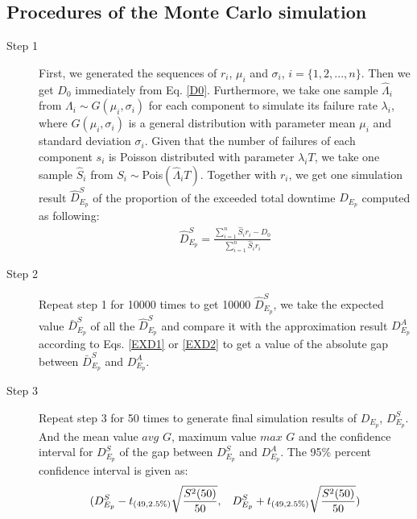 \documentclass[preprint,12pt]{elsarticle}
\begin{document}
\begin{appendices}

\section{Procedures of the Monte Carlo simulation}
\label{MCP}
\begin{description}
\item[Step 1]
First, we generated the sequences of $r_{i}$, $\mu_{i}$ and $\sigma_{i}$, $i=\{1,2,...,n\}$. Then we get $D_0$ immediately from Eq. \eqref{D0}. Furthermore, we take one sample $\hat{\Lambda}_{i}$ from $\Lambda_{i} \sim G(\mu_{i},\sigma_{i})$ for each component to simulate its failure rate $\lambda_{i}$, where $G(\mu_{i},\sigma_{i})$ is a general distribution with parameter mean $\mu_{i}$ and standard deviation $\sigma_{i}$. Given that the number of failures of each component $s_{i}$ is Poisson distributed with parameter $\lambda_{i}T$, we take one sample $\hat{S}_{i}$ from $S_{i}\sim$Pois$(\hat{\Lambda}_{i}T)$. Together with $r_{i}$, we get one simulation result $\hat{D}_{E_{p}}^{S}$ of the proportion of the exceeded total downtime $D_{E_{p}}$ computed as following:
\begin{eqnarray}
\hat{D}_{E_{p}}^{S}=\frac{\sum_{i=1}^{n}{\hat{S}_{i}r_{i}}-D_0}{\sum_{i=1}^{n}{\hat{S}_{i}r_{i}}}
\end{eqnarray}

\item[Step 2]

Repeat step 1 for 10000 times to get 10000 $\hat{D}_{E_{p}}^{S}$, we take the expected value $\bar{D}_{E_{p}}^{S}$ of all the $\hat{D}_{E_{p}}^{S}$ and compare it with the approximation result $D_{E_{p}}^{A}$ according to Eqs. \eqref{EXD1} or \eqref{EXD2}  to get a value of the absolute gap between $\bar{D}_{E_{p}}^{S}$ and $D_{E_{p}}^{A}$.

\item[Step 3]

Repeat step 3 for 50 times to generate final simulation results of $D_{E_{p}}$, $D_{E_{p}}^{S}$. And the mean value $avg$ $G$, maximum value $max$ $G$ and the confidence interval for $D_{E_{p}}^{S}$ of the gap between $D_{E_{p}}^{S}$ and $D_{E_{p}}^{A}$. The 95\% percent confidence interval is given as:
$$(D_{E_{p}}^{S}-t_{(49,2.5\%)}\sqrt{\frac{S^{2}(50)}{50}},\hspace{3mm}D_{E_{p}}^{S}+t_{(49,2.5\%)}\sqrt{\frac{S^{2}(50)}{50}} ) $$


\end{description}
\end{appendices}
\end{document}
